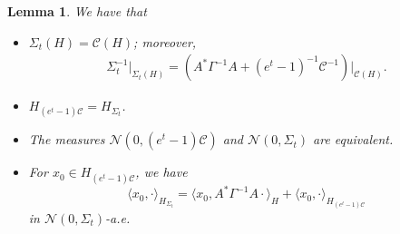 \documentclass[10pt]{article} %
\theoremstyle{plain}
\newtheorem{lemma}[theorem]{Lemma}
\theoremstyle{definition}
\theoremstyle{remark}
\newcommand{\norm}[1]{\left\|#1\right\|}
\newcommand{\C}{\mathcal C}
\newcommand{\N}{\mathcal N}
\newcommand{\Natural}{\mathbb N}
\newcommand{\cl}{\text{cl}}
\begin{document}

\begin{lemma}\label{lem: relation between CM spaces of U and Vt}
    We have that
    \begin{itemize}
        \item [(i)] $\Sigma_t(H) = \C(H)$; moreover,
    \begin{eqnarray}\label{eq: Sigma_t_inv in infinite dimension}
        \Sigma_t^{-1}\big|_{\Sigma_t(H)} = (A^*\Gamma^{-1}A  +(e^t-1)^{-1} \C^{-1})\big|_{\C(H)}.
    \end{eqnarray}
        \item [(ii)] $H_{(e^t-1) \C} =H_{\Sigma_t}$. 
        \item [(iii)] 
        The measures $\N(0, (e^t-1)\C)$ and $\N(0, \Sigma_t)$ are equivalent.
        \item [(iv)] 
        For $x_0 \in H_{(e^t-1) \C}$, we have
        \begin{equation}\label{eq: Equation for new Cameron-Martin space}
   \langle x_0, \cdot \rangle_{H_{\Sigma_t}} = \langle x_0, A^*\Gamma^{-1}A \cdot \rangle_H +  \langle x_0, \cdot \rangle_{H_{(e^t-1) \C}}
    \end{equation}
    in $\N(0,\Sigma_t)$-a.e. 
    \end{itemize}
\end{lemma}
\end{document}
